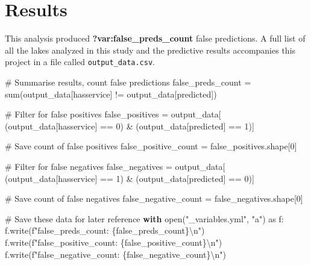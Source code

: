 \documentclass[
]{article}
\newenvironment{Shaded}{\begin{snugshade}}{\end{snugshade}}
\newcommand{\BuiltInTok}[1]{\textcolor[rgb]{0.00,0.23,0.31}{#1}}
\newcommand{\CharTok}[1]{\textcolor[rgb]{0.13,0.47,0.30}{#1}}
\newcommand{\CommentTok}[1]{\textcolor[rgb]{0.37,0.37,0.37}{#1}}
\newcommand{\ControlFlowTok}[1]{\textcolor[rgb]{0.00,0.23,0.31}{\textbf{#1}}}
\newcommand{\DecValTok}[1]{\textcolor[rgb]{0.68,0.00,0.00}{#1}}
\newcommand{\ImportTok}[1]{\textcolor[rgb]{0.00,0.46,0.62}{#1}}
\newcommand{\NormalTok}[1]{\textcolor[rgb]{0.00,0.23,0.31}{#1}}
\newcommand{\OperatorTok}[1]{\textcolor[rgb]{0.37,0.37,0.37}{#1}}
\newcommand{\SpecialCharTok}[1]{\textcolor[rgb]{0.37,0.37,0.37}{#1}}
\newcommand{\SpecialStringTok}[1]{\textcolor[rgb]{0.13,0.47,0.30}{#1}}
\newcommand{\StringTok}[1]{\textcolor[rgb]{0.13,0.47,0.30}{#1}}
\begin{document}
\section{Results}\label{results}

This analysis produced \textbf{?var:false\_preds\_count} false
predictions. A full list of all the lakes analyzed in this study and the
predictive results accompanies this project in a file called
\texttt{output\_data.csv}.

\begin{Shaded}
\begin{Highlighting}[]
\CommentTok{\# Summarise results, count false predictions}
\NormalTok{false\_preds\_count }\OperatorTok{=} \BuiltInTok{sum}\NormalTok{(output\_data[}\StringTok{\textquotesingle{}hasservice\textquotesingle{}}\NormalTok{] }\OperatorTok{!=}\NormalTok{ output\_data[}\StringTok{\textquotesingle{}predicted\textquotesingle{}}\NormalTok{])}

\CommentTok{\# Filter for false positives}
\NormalTok{false\_positives }\OperatorTok{=}\NormalTok{ output\_data[}
\NormalTok{    (output\_data[}\StringTok{\textquotesingle{}hasservice\textquotesingle{}}\NormalTok{] }\OperatorTok{==} \DecValTok{0}\NormalTok{) }\OperatorTok{\&} 
\NormalTok{    (output\_data[}\StringTok{\textquotesingle{}predicted\textquotesingle{}}\NormalTok{] }\OperatorTok{==} \DecValTok{1}\NormalTok{)]}

\CommentTok{\# Save count of false positives}
\NormalTok{false\_positive\_count }\OperatorTok{=}\NormalTok{ false\_positives.shape[}\DecValTok{0}\NormalTok{]}

\CommentTok{\# Filter for false negatives}
\NormalTok{false\_negatives }\OperatorTok{=}\NormalTok{ output\_data[}
\NormalTok{    (output\_data[}\StringTok{\textquotesingle{}hasservice\textquotesingle{}}\NormalTok{] }\OperatorTok{==} \DecValTok{1}\NormalTok{) }\OperatorTok{\&} 
\NormalTok{    (output\_data[}\StringTok{\textquotesingle{}predicted\textquotesingle{}}\NormalTok{] }\OperatorTok{==} \DecValTok{0}\NormalTok{)]}

\CommentTok{\# Save count of false negatives}
\NormalTok{false\_negative\_count }\OperatorTok{=}\NormalTok{ false\_negatives.shape[}\DecValTok{0}\NormalTok{]}

\CommentTok{\# Save these data for later reference}
\ControlFlowTok{with} \BuiltInTok{open}\NormalTok{(}\StringTok{"\_variables.yml"}\NormalTok{, }\StringTok{"a"}\NormalTok{) }\ImportTok{as}\NormalTok{ f:}
\NormalTok{    f.write(}\SpecialStringTok{f"false\_preds\_count: }\SpecialCharTok{\{}\NormalTok{false\_preds\_count}\SpecialCharTok{\}}\CharTok{\textbackslash{}n}\SpecialStringTok{"}\NormalTok{)}
\NormalTok{    f.write(}\SpecialStringTok{f"false\_positive\_count: }\SpecialCharTok{\{}\NormalTok{false\_positive\_count}\SpecialCharTok{\}}\CharTok{\textbackslash{}n}\SpecialStringTok{"}\NormalTok{)}
\NormalTok{    f.write(}\SpecialStringTok{f"false\_negative\_count: }\SpecialCharTok{\{}\NormalTok{false\_negative\_count}\SpecialCharTok{\}}\CharTok{\textbackslash{}n}\SpecialStringTok{"}\NormalTok{)}
\end{Highlighting}
\end{Shaded}
\end{document}
